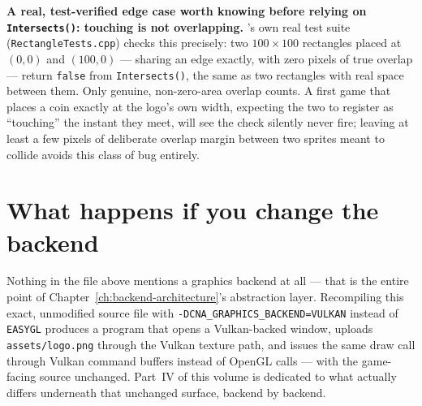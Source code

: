 \begin{sourcenote}
\textbf{A real, test-verified edge case worth knowing before relying on
\texttt{Intersects()}: touching is not overlapping.} 's own real test
suite (\texttt{RectangleTests.cpp}) checks this precisely: two $100\times100$ rectangles
placed at $(0,0)$ and $(100,0)$ --- sharing an edge exactly, with zero pixels of true overlap
--- return \texttt{false} from \texttt{Intersects()}, the same as two rectangles with real
space between them. Only genuine, non-zero-area overlap counts. A first game that places a
coin exactly at the logo's own width, expecting the two to register as ``touching'' the
instant they meet, will see the check silently never fire; leaving at least a few pixels of
deliberate overlap margin between two sprites meant to collide avoids this class of bug
entirely.
\end{sourcenote}

\section{What happens if you change the backend}

Nothing in the file above mentions a graphics backend at all --- that is the entire point of
Chapter~\ref{ch:backend-architecture}'s abstraction layer. Recompiling this exact,
unmodified source file with \texttt{-DCNA\_GRAPHICS\allowbreak{}\_BACKEND=VULKAN} instead of
\texttt{EASYGL} produces a program that opens a Vulkan-backed window, uploads
\texttt{assets/logo.png} through the Vulkan texture path, and issues the same
 draw call through Vulkan command buffers instead of OpenGL calls ---
with the game-facing source unchanged. Part~IV of this volume is dedicated to what actually
differs underneath that unchanged surface, backend by backend.
